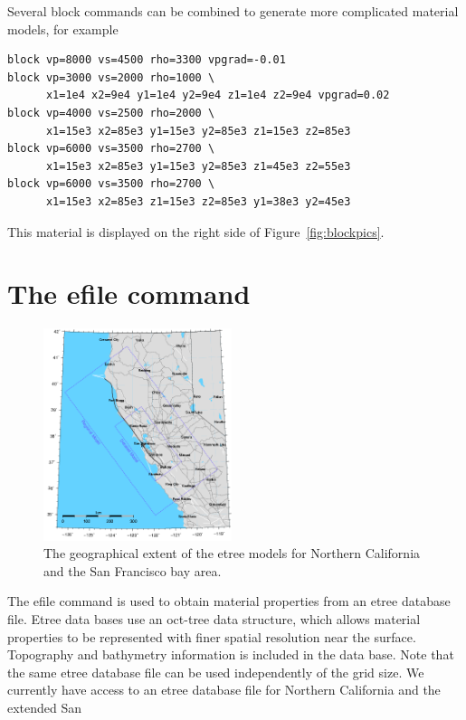 \documentclass[11pt]{report}
\begin{document}
Several block commands can be combined to generate more complicated material models, for example
\begin{verbatim}
block vp=8000 vs=4500 rho=3300 vpgrad=-0.01
block vp=3000 vs=2000 rho=1000 \
      x1=1e4 x2=9e4 y1=1e4 y2=9e4 z1=1e4 z2=9e4 vpgrad=0.02
block vp=4000 vs=2500 rho=2000 \
      x1=15e3 x2=85e3 y1=15e3 y2=85e3 z1=15e3 z2=85e3
block vp=6000 vs=3500 rho=2700 \
      x1=15e3 x2=85e3 y1=15e3 y2=85e3 z1=45e3 z2=55e3
block vp=6000 vs=3500 rho=2700 \
      x1=15e3 x2=85e3 z1=15e3 z2=85e3 y1=38e3 y2=45e3
\end{verbatim}
This material is displayed on the right side of Figure~\ref{fig:blockpics}.

\section{The efile command} \label{sec:efile}
\begin{figure}
\begin{centering}
  \includegraphics[width=0.49\textwidth]{velmodelbb_roads.png} \hfil
  \caption{The geographical extent of the etree models for Northern California and the San Francisco
  bay area.}
  \label{fig:sfmodel}
\end{centering}
\end{figure}
The efile command is used to obtain material properties from an etree database file. Etree data
bases use an oct-tree data structure, which allows material properties to be represented with finer
spatial resolution near the surface. Topography and bathymetry information is included in the data
base. Note that the same etree database file can be used independently of the grid size. We
currently have access to an etree database file for Northern California and the extended San
\end{document}
